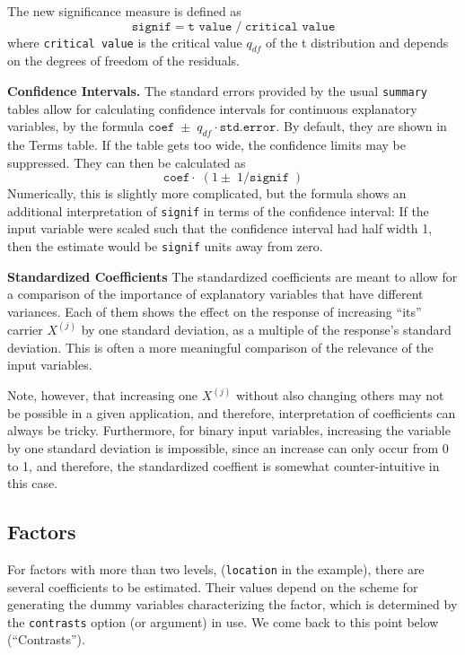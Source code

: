 \documentclass{article}
\providecommand{\T}{\texttt}
\providecommand{\Tit}[1]{\textbf{#1}\hspace{1em}}
\begin{document}
The new significance measure is defined as
\[
  \T{signif} = \T{t value}\;/\; \T{critical value}
\]
where \T{critical value} is the critical value $q_{df}$ of the 
t distribution and depends on the degrees of freedom of the residuals. 

\Tit{Confidence Intervals.}
The standard errors provided by the usual \T{summary} tables allow for
calculating confidence intervals for continuous explanatory variables,
by the formula $\T{coef} \;\pm\; q_{df}\cdot\T{std.error}$.
By default, they are shown in the Terms table. 
If the table gets too wide, the confidence limits may be suppressed.
They can then be calculated as
\[
  \T{coef}\cdot\;(1\pm\;1/\T{signif}\;)
\]
Numerically, this is slightly more complicated, but the formula shows
an additional interpretation of \T{signif} in terms of the 
confidence interval:
If the input variable were scaled such that the confidence interval had 
half width 1, then the estimate would be \T{signif} units away from zero.

\Tit{Standardized Coefficients}
The standardized coefficients are meant to allow for a comparison of the 
importance of explanatory variables that have different variances.
Each of them shows the effect on the response of increasing ``its'' 
carrier $X^{(j)}$ by one standard deviation, as a multiple 
of the response's standard deviation. 
This is often a more meaningful comparison of the relevance of the input
variables. 

Note, however, that increasing one $X^{(j)}$ without also changing
others may not be possible in a given application, and therefore, 
interpretation of coefficients can always be tricky.
Furthermore, for binary input variables, increasing the variable by one
standard deviation is impossible, since an increase can only occur from 0
to 1, and therefore, the standardized coeffient is somewhat 
counter-intuitive in this case.

\subsection{Factors}
For factors with more than two levels, (\T{location} in the example), there
are several coefficients to be estimated. 
Their values depend on the scheme for generating the 
dummy variables characterizing the factor, which is determined 
by the \T{contrasts} option (or argument) in use.
We come back to this point below (``Contrasts'').
\end{document}
